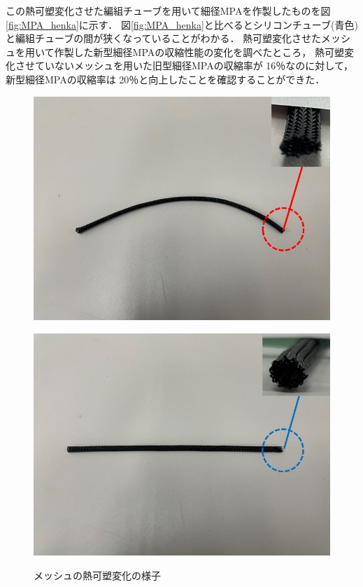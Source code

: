 この熱可塑変化させた編組チューブを用いて細径MPAを作製したものを図\ref{fig:MPA_henka}に示す．
図\ref{fig:MPA_henka}と比べるとシリコンチューブ(青色)と編組チューブの間が狭くなっていることがわかる．
熱可塑変化させたメッシュを用いて作製した新型細径MPAの収縮性能の変化を調べたところ，
熱可塑変化させていないメッシュを用いた旧型細径MPAの収縮率が 16％なのに対して，新型細径MPAの収縮率は 20％と向上したことを確認することができた．
%
\begin{figure}[htbp]
  \begin{minipage}{0.49\hsize}
    \centering  
    \includegraphics[scale=0.25]{image/messhu_hikaku_1.jpg}
    \label{fig:messhu_1}
  \end{minipage}
  \begin{minipage}{0.49\hsize}
    \centering
    \includegraphics[scale=0.25]{image/messhu_hikaku_2.jpg}
    \label{fig:messhu_2}
  \end{minipage}
  \caption{メッシュの熱可塑変化の様子}
  \label{fig:messhu_henka}
\end{figure}
